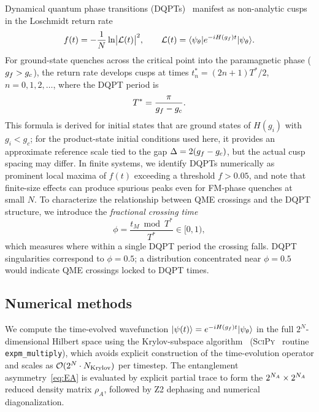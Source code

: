 Dynamical quantum phase transitions (DQPTs)~\cite{Heyl2013,Heyl2018} manifest as
non-analytic cusps in the Loschmidt return rate
\begin{equation}
  f(t) = -\frac{1}{N}\ln\bigl|\mathcal{L}(t)\bigr|^2, \qquad
  \mathcal{L}(t) = \langle\psi_\theta|e^{-iH(g_f)t}|\psi_\theta\rangle.
  \label{eq:losch}
\end{equation}
For ground-state quenches across the critical point into the paramagnetic phase
($g_f > g_c$), the return rate develops cusps at
times $t_n^* = (2n+1)T^*/2$, $n = 0, 1, 2, \ldots$, where the DQPT period
is~\cite{Heyl2013}
\begin{equation}
  T^* = \frac{\pi}{g_f - g_c}.
  \label{eq:Tstar}
\end{equation}
This formula is derived for initial states that are ground states of $H(g_i)$ with
$g_i < g_c$; for the product-state initial conditions used here, it provides an
approximate reference scale tied to the gap $\Delta = 2(g_f - g_c)$, but the
actual cusp spacing may differ.
In finite systems, we identify DQPTs numerically as prominent local maxima of $f(t)$
exceeding a threshold $f > 0.05$, and note that finite-size effects can produce
spurious peaks even for FM-phase quenches at small $N$.
To characterize the relationship between QME crossings and the DQPT structure, we
introduce the \emph{fractional crossing time}
\begin{equation}
  \phi = \frac{t_M \bmod T^*}{T^*} \in [0,1),
  \label{eq:phi}
\end{equation}
which measures where within a single DQPT period the crossing falls.
DQPT singularities correspond to $\phi = 0.5$; a distribution concentrated near $\phi = 0.5$
would indicate QME crossings locked to DQPT times.

\subsection{Numerical methods}
\label{sec:numerics}

We compute the time-evolved wavefunction $|\psi(t)\rangle = e^{-iH(g_f)t}|\psi_\theta\rangle$
in the full $2^N$-dimensional Hilbert space using the Krylov-subspace
algorithm~\cite{AlMohy2011} (\textsc{SciPy}~\cite{Virtanen2020} routine
\texttt{expm\_multiply}), which avoids explicit construction of the time-evolution operator
and scales as $\mathcal{O}(2^N \cdot N_{\rm Krylov})$ per timestep.
The entanglement asymmetry~\eqref{eq:EA} is evaluated by explicit partial trace to form
the $2^{N_A}\times 2^{N_A}$ reduced density matrix $\rho_A$, followed by Z2 dephasing and
numerical diagonalization.

